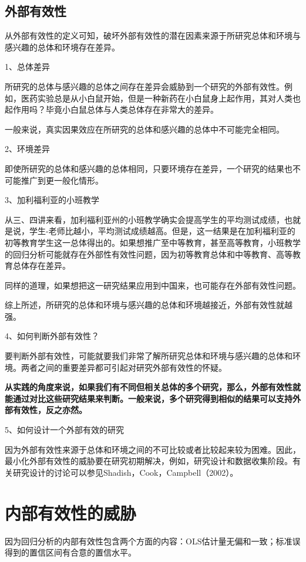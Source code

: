 \documentclass[cn,12pt,math=newtx,citestyle=gb7714-2015,bibstyle=gb7714-2015]{elegantbook}
\begin{document}
\subsection{外部有效性}
从外部有效性的定义可知，破坏外部有效性的潜在因素来源于所研究总体和环境与感兴趣的总体和环境存在差异。

1、总体差异

所研究的总体与感兴趣的总体之间存在差异会威胁到一个研究的外部有效性。例如，医药实验总是从小白鼠开始，但是一种新药在小白鼠身上起作用，其对人类也起作用吗？毕竟小白鼠总体与人类总体存在非常大的差异。

一般来说，真实因果效应在所研究的总体和感兴趣的总体中不可能完全相同。

2、环境差异

即使所研究的总体和感兴趣的总体相同，只要环境存在差异，一个研究的结果也不可能推广到更一般化情形。

3、加利福利亚的小班教学

从三、四讲来看，加利福利亚州的小班教学确实会提高学生的平均测试成绩，也就是说，学生-老师比越小，平均测试成绩越高。但是，这一结果是在加利福利亚的初等教育学生这一总体得出的。如果想推广至中等教育，甚至高等教育，小班教学的回归分析可能就存在外部性有效性问题，因为初等教育总体和中等教育、高等教育总体存在差异。

同样的道理，如果想把这一研究结果应用到中国来，也可能存在外部有效性问题。

综上所述，所研究的总体和环境与感兴趣的总体和环境越接近，外部有效性就越强。

4、如何判断外部有效性？

要判断外部有效性，可能就要我们非常了解所研究总体和环境与感兴趣的总体和环境。两者之间的重要差异都可引起对研究外部有效性的怀疑。

\textbf{从实践的角度来说，如果我们有不同但相关总体的多个研究，那么，外部有效性就能通过对比这些研究结果来判断。一般来说，多个研究得到相似的结果可以支持外部有效性，反之亦然。}

5、如何设计一个外部有效的研究

因为外部有效性来源于总体和环境之间的不可比较或者比较起来较为困难。因此，最小化外部有效性的威胁要在研究初期解决，例如，研究设计和数据收集阶段。有关研究设计的讨论可以参见Shadish，Cook，Campbell（2002）。

\section{内部有效性的威胁}
因为回归分析的内部有效性包含两个方面的内容：OLS估计量无偏和一致；标准误得到的置信区间有合意的置信水平。
\end{document}
